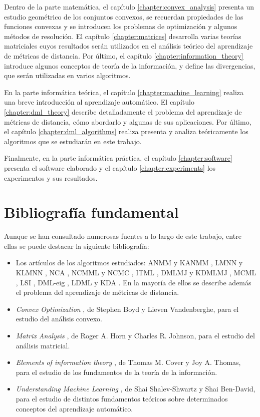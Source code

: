 Dentro de la parte matemática, el capítulo \ref{chapter:convex_analysis} presenta un estudio geométrico de los conjuntos convexos, se recuerdan propiedades de las funciones convexas y se introducen los problemas de optimización y algunos métodos de resolución. El capítulo \ref{chapter:matrices} desarrolla varias teorías matriciales cuyos resultados serán utilizados en el análisis teórico del aprendizaje de métricas de distancia. Por último, el capítulo \ref{chapter:information_theory} introduce algunos conceptos de teoría de la información, y define las divergencias, que serán utilizadas en varios algoritmos.

En la parte informática teórica, el capítulo \ref{chapter:machine_learning} realiza una breve introducción al aprendizaje automático. El capítulo \ref{chapter:dml_theory} describe detalladamente el problema del aprendizaje de métricas de distancia, cómo abordarlo y algunas de sus aplicaciones. Por último, el capítulo \ref{chapter:dml_algorithms} realiza presenta y analiza teóricamente los algoritmos que se estudiarán en este trabajo.

Finalmente, en la parte informática práctica, el capítulo \ref{chapter:software} presenta el software elaborado y el capítulo \ref{chapter:experiments} los experimentos y sus resultados.

\section{Bibliografía fundamental}

Aunque se han consultado numerosas fuentes a lo largo de este trabajo, entre ellas se puede destacar la siguiente bibliografía:
\begin{itemize}
    \item Los artículos de los algoritmos estudiados: ANMM y KANMM \cite{anmm}, LMNN y KLMNN \cite{lmnn}, NCA \cite{nca}, NCMML y NCMC \cite{ncmml}, ITML \cite{itml}, DMLMJ y KDMLMJ \cite{dmlmj}, MCML \cite{mcml}, LSI \cite{lsi}, DML-eig \cite{dmleig}, LDML \cite{ldml} y KDA \cite{kda}. En la mayoría de ellos se describe además el problema del aprendizaje de métricas de distancia.
    \item \emph{Convex Optimization} \cite{convexoptimization}, de Stephen Boyd y Lieven Vandenberghe, para el estudio del análisis convexo.
    \item \emph{Matrix Analysis} \cite{matrix_analysis}, de Roger A. Horn y Charles R. Johnson, para el estudio del análisis matricial.
    \item \emph{Elements of information theory} \cite{information_theory}, de Thomas M. Cover y Joy A. Thomas, para el estudio de los fundamentos de la teoría de la información.
    \item \emph{Understanding Machine Learning} \cite{understandingml}, de Shai Shalev-Shwartz y Shai Ben-David, para el estudio de distintos fundamentos teóricos sobre determinados conceptos del aprendizaje automático.
\end{itemize}

